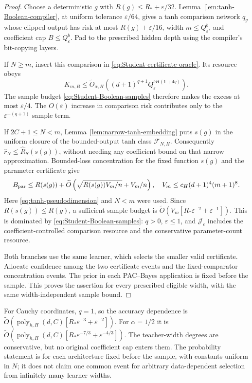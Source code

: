 \begin{proof}
Choose a deterministic $g$ with $R(g)\le R_*+\varepsilon/32$. Lemma~\ref{lem:tanh-Boolean-compiler}, at uniform tolerance $\varepsilon/64$, gives a tanh comparison network $q_g$ whose clipped output has risk at most $R(g)+\varepsilon/16$, width $m\le Q_\varepsilon^b$, and coefficient cap $B\le Q_\varepsilon^b$. Pad to the prescribed hidden depth using the compiler's bit-copying layers.

If $N\ge m$, insert this comparison in \eqref{eq:Student-certificate-oracle}. Its resource obeys
\[
 K_{m,B}\le\widetilde O_{\alpha,H}\left(
 (d+1)^{q+1}Q_\varepsilon^{bH(1+4q)}\right).
\]
The sample budget \eqref{eq:Student-Boolean-samples} therefore makes the excess at most $\varepsilon/4$. The $O(\varepsilon)$ increase in comparison risk contributes only to the $\varepsilon^{-(q+1)}$ sample term.

If $2C+1\le N<m$, Lemma~\ref{lem:narrow-tanh-embedding} puts $s(g)$ in the uniform closure of the bounded-output tanh class $\mathcal F_{N,H}$. Consequently $\widehat r_N\le\widehat R_S(s(g))$, without needing any coefficient bound on that narrow approximation. Bounded-loss concentration for the fixed function $s(g)$ and the parameter certificate give
\[
 B_{\rm par}\le R(s(g))+
 \widetilde O\left(\sqrt{R(s(g))V_m/n}+V_m/n\right),
 \quad V_m\le c_H(d+1)^4(m+1)^8.
\]
Here \eqref{eq:tanh-pseudodimension} and $N<m$ were used. Since $R(s(g))\le R(g)$, a sufficient sample budget is
$\widetilde O(V_m[R_*\varepsilon^{-2}+\varepsilon^{-1}])$.
This is dominated by \eqref{eq:Student-Boolean-samples}: $q>0$, $\varepsilon\le1$, and $\mathcal J_\varepsilon$ includes the coefficient-controlled comparison resource and the conservative parameter-count resource.

Both branches use the same learner, which selects the smaller valid certificate. Allocate confidence among the two certificate events and the fixed-comparator concentration events. The prior in each PAC--Bayes application is fixed before the sample. This proves the assertion for every prescribed eligible width, with the same width-independent sample bound.
\end{proof}

For Cauchy coordinates, $q=1$, so the accuracy dependence is
$\widetilde O(\operatorname{poly}_{h,H}(d,C)
 [R_*\varepsilon^{-3}+\varepsilon^{-2}])$.
For $\alpha=1/2$ it is
$\widetilde O(\operatorname{poly}_{h,H}(d,C)
 [R_*\varepsilon^{-7/3}+\varepsilon^{-4/3}])$.
The teacher-width degrees are conservative, but no original coefficient cap enters them. The probability statement is for each architecture fixed before the sample, with constants uniform in $N$; it does not claim one common event for arbitrary data-dependent selection from infinitely many learner widths.
